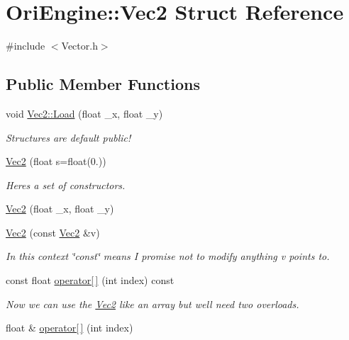 \hypertarget{struct_ori_engine_1_1_vec2}{}\section{Ori\+Engine\+:\+:Vec2 Struct Reference}
\label{struct_ori_engine_1_1_vec2}


{\ttfamily \#include $<$Vector.\+h$>$}

\subsection*{Public Member Functions}
\begin{DoxyCompactItemize}
\item 
void \hyperlink{struct_ori_engine_1_1_vec2_af08ea6c4eedd4b37fe25815f3555015e}{Vec2\+::\+Load} (float \+\_\+x, float \+\_\+y)
\begin{DoxyCompactList}\small\item\em Structures are default public! \end{DoxyCompactList}\item 
\hyperlink{struct_ori_engine_1_1_vec2_a115419a0f94d31618b93c03be1117089}{Vec2} (float s=float(0.))
\begin{DoxyCompactList}\small\item\em Here\textquotesingle{}s a set of constructors. \end{DoxyCompactList}\item 
\hyperlink{struct_ori_engine_1_1_vec2_a3f324decdc2b86e4a498a95e706f4c20}{Vec2} (float \+\_\+x, float \+\_\+y)
\item 
\hyperlink{struct_ori_engine_1_1_vec2_a8769147a1ce655442d97dbeb504151a7}{Vec2} (const \hyperlink{struct_ori_engine_1_1_vec2}{Vec2} \&v)
\begin{DoxyCompactList}\small\item\em In this context \char`\"{}const\char`\"{} means I promise not to modify anything v points to. \end{DoxyCompactList}\item 
const float \hyperlink{struct_ori_engine_1_1_vec2_a481efce1521eb8c44802275f56030ea5}{operator\mbox{[}$\,$\mbox{]}} (int index) const
\begin{DoxyCompactList}\small\item\em Now we can use the \hyperlink{struct_ori_engine_1_1_vec2}{Vec2} like an array but we\textquotesingle{}ll need two overloads. \end{DoxyCompactList}\item 
float \& \hyperlink{struct_ori_engine_1_1_vec2_a80dd5e430ccf80c1e7cac25da0262a8d}{operator\mbox{[}$\,$\mbox{]}} (int index)
\end{DoxyCompactItemize}
